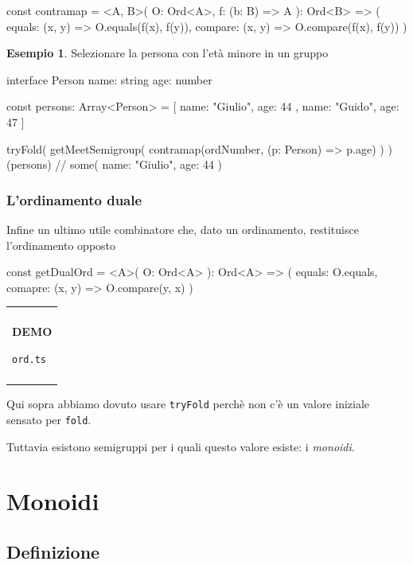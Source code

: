 \documentclass[12pt]{article}
\theoremstyle{definition}
\newtheorem{example}{Esempio}[section]
\newenvironment{demo}
    {\begin{center}
    \begin{tabular}{|p{0.9\textwidth}|}
    \hline\\
    }
    {
    \\\\\hline
    \end{tabular}
    \end{center}
    }
\newenvironment{code}
  {\vspace{0.5cm} \VerbatimEnvironment\begin{typescriptcode}}
  {\end{typescriptcode} \vspace{0.2cm}}
\begin{document}
\begin{code}
const contramap = <A, B>(
  O: Ord<A>,
  f: (b: B) => A
): Ord<B> => ({
  equals: (x, y) => O.equals(f(x), f(y)),
  compare: (x, y) => O.compare(f(x), f(y))
})
\end{code}

\begin{example}
Selezionare la persona con l'età minore in un gruppo

\begin{code}
interface Person {
  name: string
  age: number
}

const persons: Array<Person> = [
  { name: "Giulio", age: 44 },
  { name: "Guido", age: 47 }
]

tryFold(
  getMeetSemigroup(
    contramap(ordNumber, (p: Person) => p.age)
  )
)(persons) // some({ name: "Giulio", age: 44 })
\end{code}
\end{example}

\subsubsection{L'ordinamento duale}

Infine un ultimo utile combinatore che, dato un ordinamento, restituisce l'ordinamento opposto

\begin{code}
const getDualOrd = <A>(
  O: Ord<A>
): Ord<A> => ({
  equals: O.equals,
  comapre: (x, y) => O.compare(y, x)
})
\end{code}

\begin{demo}
\begin{center}
\textbf{DEMO}

\texttt{ord.ts}
\end{center}
\end{demo}


Qui sopra abbiamo dovuto usare \texttt{tryFold} perchè non c'è un valore iniziale sensato per \texttt{fold}.

Tuttavia esistono semigruppi per i quali questo valore esiste: i \emph{monoidi}.

\section{Monoidi}

\subsection{Definizione}
\end{document}

